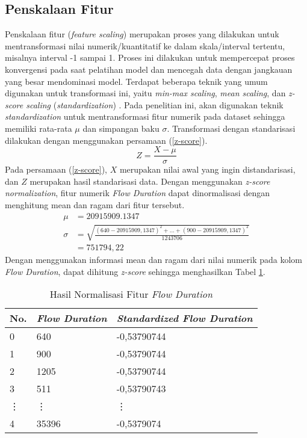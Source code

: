 \documentclass[a4paper,12pt]{report}
\begin{document}
\subsection{Penskalaan Fitur}
Penskalaan fitur (\textit{feature scaling}) merupakan proses yang dilakukan untuk mentransformasi nilai numerik/kuantitatif ke dalam skala/interval tertentu, misalnya interval -1 sampai 1. Proses ini dilakukan untuk mempercepat proses konvergensi pada saat pelatihan model dan mencegah data dengan jangkauan yang besar mendominasi model. Terdapat beberapa teknik yang umum digunakan untuk transformasi ini, yaitu \textit{min-max scaling}, \textit{mean scaling}, dan \textit{z-score scaling} (\textit{standardization}) \cite{pajankarHandsonMachineLearning2022}. Pada penelitian ini, akan digunakan teknik \textit{standardization} untuk mentransformasi fitur numerik pada dataset sehingga memiliki rata-rata $\mu$ dan simpangan baku $\sigma$. Transformasi dengan standarisasi dilakukan dengan menggunakan persamaan (\ref{z-score}).
\begin{equation}
	Z = \frac{X-\mu}{\sigma}
	\label{z-score}
\end{equation}
Pada persamaan (\ref{z-score}), $X$ merupakan nilai awal yang ingin distandarisasi, dan $Z$ merupakan hasil standarisasi data. Dengan menggunakan \textit{z-score normalization}, fitur numerik \textit{Flow Duration} dapat dinormalisasi dengan menghitung mean dan ragam dari fitur tersebut.
\begin{equation}
	\begin{split}
		\mu &= 20915909.1347 \\
		\sigma &= \sqrt{\frac{(640-20915909,1347)^2 + ... + (900-20915909,1347)^2}{1243706}} \\
		&= 751794,22
	\end{split}
\end{equation}  
Dengan menggunakan informasi mean dan ragam dari nilai numerik pada kolom \textit{Flow Duration}, dapat dihitung \textit{z-score} sehingga menghasilkan Tabel \ref{tabelNorm}.

 \begin{longtable}{|l|l|l|}
	\caption{Hasil Normalisasi Fitur \textit{Flow Duration}} \label{tabelNorm}\\
	\hline
	No. & \textit{Flow Duration} & \textit{Standardized Flow Duration} \\ \hline
	0 & 640 & -0,53790744 \\ \hline
	1 & 900 & -0,53790744 \\ \hline
	2 & 1205 & -0,53790744 \\ \hline
	3 & 511	 & -0,53790743 \\ \hline
	\vdots & \vdots & \vdots \\ \hline
	4 & 35396 & -0,5379074 \\ \hline
\end{longtable}
\end{document}
